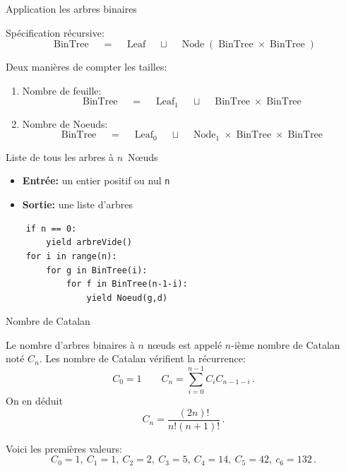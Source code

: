 \documentclass{beamer}
\def\opstyle#1{\ensuremath{\operatorname{#1}}}
\begin{document}
\newcommand{\BinTree}{\opstyle{BinTree}}
\newcommand{\Leaf}{\opstyle{Leaf}}
\newcommand{\Node}{\opstyle{Node}}

\begin{frame}{Application les arbres binaires}

  Spécification récursive:
  \[\BinTree\quad=\quad\Leaf\quad \sqcup\quad \Node(\BinTree\times\BinTree)\]
  \pause\bigskip

  Deux manières de compter les tailles:
  \begin{enumerate}
  \item Nombre de feuille:
  \[\BinTree\quad=\quad\Leaf_1\quad \sqcup\quad \BinTree\times\BinTree\]
  \item Nombre de Noeuds:
  \[\BinTree\quad=\quad\Leaf_0\quad \sqcup\quad \Node_1\times\BinTree\times\BinTree\]
  \end{enumerate}
\end{frame}

\begin{frame}[fragile]{Liste de tous les arbres à $n$~N\oe uds}
   \begin{ALGO}
    \begin{itemize}
    \item \textbf{Entrée:} un entier positif ou nul \texttt{n}
    \item \textbf{Sortie:} une liste d'arbres
    \end{itemize}
\begin{verbatim}
    if n == 0:
        yield arbreVide()
    for i in range(n):
        for g in BinTree(i):
            for f in BinTree(n-1-i):
                yield Noeud(g,d)
\end{verbatim}
  \end{ALGO}
\end{frame}

\begin{frame}{Nombre de Catalan}
  \begin{PROP}
    Le nombre d'arbres binaires à $n$ n\oe uds est appelé $n$-ième nombre de
    Catalan noté $C_n$. Les nombre de Catalan vérifient la récurrence:
    \begin{equation*}
      C_0=1\qquad C_n = \sum_{i=0}^{n-1} C_i C_{n-1-i}\,.
    \end{equation*}
    On en déduit
    \begin{equation*}
      C_n = \frac{(2n)!}{n!(n+1)!}\,.
    \end{equation*}
  \end{PROP}
  Voici les premières valeurs:
  \[C_0=1,\ C_1=1,\ C_2=2,\ C_3=5,\ C_4=14,\ C_5=42,\ c_6=132\,.\]
\end{frame}
\end{document}
